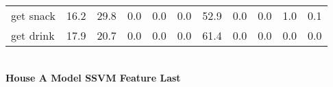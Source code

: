 \documentclass{article}
\begin{document}
\begin{sideways}
\begin{tabular}{lrrrrrrrrrr}
get snack         &        16.2 &               29.8 &               0.0 &                0.0 &                0.0 &             52.9 &                      0.0 &                   0.0 &              1.0 &              0.1 \\
get drink         &        17.9 &               20.7 &               0.0 &                0.0 &                0.0 &             61.4 &                      0.0 &                   0.0 &              0.0 &              0.0 \\
\bottomrule
\end{tabular}
\end{sideways}
\normalsize
\vspace{1cm}\\
\textbf{House A Model SSVM Feature Last}\\
\vspace{1cm}\\
\end{document}
